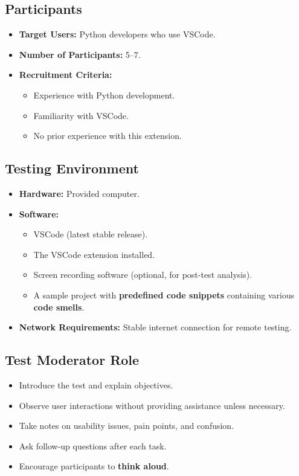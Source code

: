 \documentclass[12pt, titlepage]{article}
\begin{document}
\subsection*{Participants}
\begin{itemize}
    \item \textbf{Target Users:} Python developers who use VSCode.
    \item \textbf{Number of Participants:} 5–7.
    \item \textbf{Recruitment Criteria:}
        \begin{itemize}
            \item Experience with Python development.
            \item Familiarity with VSCode.
            \item No prior experience with this extension.
        \end{itemize}
\end{itemize}

\subsection*{Testing Environment}
\begin{itemize}
    \item \textbf{Hardware:} Provided computer.
    \item \textbf{Software:}
        \begin{itemize}
            \item VSCode (latest stable release).
            \item The VSCode extension installed.
            \item Screen recording software (optional, for post-test analysis).
            \item A sample project with \textbf{predefined code snippets} containing various \textbf{code smells}.
        \end{itemize}
    \item \textbf{Network Requirements:} Stable internet connection for remote testing.
\end{itemize}

\subsection*{Test Moderator Role}
\begin{itemize}
    \item Introduce the test and explain objectives.
    \item Observe user interactions without providing assistance unless necessary.
    \item Take notes on usability issues, pain points, and confusion.
    \item Ask follow-up questions after each task.
    \item Encourage participants to \textbf{think aloud}.
\end{itemize}
\end{document}
